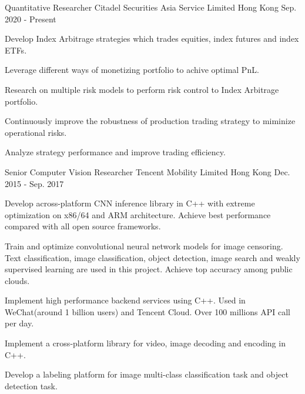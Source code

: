 

\begin{cventries}

  \cventry
    {Quantitative Researcher} %
    {Citadel Securities Asia Service Limited} %
    {Hong Kong} %
    {Sep. 2020 - Present} %
    {
      \begin{cvitems} %
        \item {Develop Index Arbitrage strategies which trades equities, index futures and index ETFs.}
        \item {Leverage different ways of monetizing portfolio to achive optimal PnL.}
        \item {Research on multiple risk models to perform risk control to Index Arbitrage portfolio.}
        \item {Continuously improve the robustness of production trading strategy to miminize operational risks.}
        \item {Analyze strategy performance and improve trading efficiency.}
      \end{cvitems}
    }

  \cventry
    {Senior Computer Vision Researcher} %
    {Tencent Mobility Limited} %
    {Hong Kong} %
    {Dec. 2015 - Sep. 2017} %
    {
      \begin{cvitems} %
        \item {Develop across-platform CNN inference library in C++ with extreme optimization on x86/64 and ARM architecture. Achieve best performance compared with all open source frameworks.}
        \item {Train and optimize convolutional neural network models for image censoring. Text classification, image classification, object detection, image search and weakly supervised learning are used in this project. Achieve top accuracy among public clouds.}
        \item {Implement high performance backend services using C++. Used in WeChat(around 1 billion users) and Tencent Cloud. Over 100 millions API call per day.}
        \item {Implement a cross-platform library for video, image decoding and encoding in C++.}
        \item {Develop a labeling platform for image multi-class classification task and object detection task.}
      \end{cvitems}
    }


\end{cventries}
